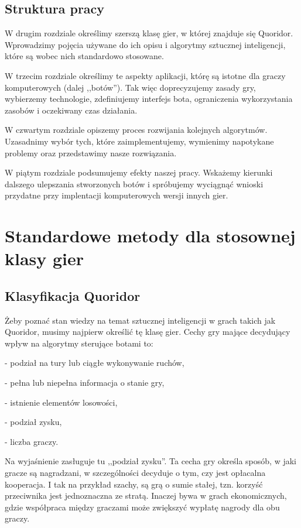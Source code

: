 \documentclass{pracamgr}
\begin{document}
\section{Struktura pracy}

W drugim rozdziale określimy szerszą klasę gier, w której znajduje się Quoridor.
Wprowadzimy pojęcia używane do ich opisu i algorytmy sztucznej inteligencji, które są wobec nich standardowo stosowane.

W trzecim rozdziale określimy te aspekty aplikacji, którę są istotne dla graczy komputerowych (dalej ,,botów'').
Tak więc doprecyzujemy zasady gry, wybierzemy technologie, zdefiniujemy interfejs bota, ograniczenia wykorzystania zasobów i oczekiwany czas działania.

W czwartym rozdziale opiszemy proces rozwijania kolejnych algorytmów.
Uzasadnimy wybór tych, które zaimplementujemy, wymienimy napotykane problemy oraz przedstawimy nasze rozwiązania.

W piątym rozdziale podsumujemy efekty naszej pracy.
Wskażemy kierunki dalszego ulepszania stworzonych botów i spróbujemy wyciągnąć wnioski przydatne przy implentacji komputerowych wersji innych gier.

\chapter{Standardowe metody dla stosownej klasy gier}

\section{Klasyfikacja Quoridor}

Żeby poznać stan wiedzy na temat sztucznej inteligencji w grach takich jak Quoridor, musimy najpierw określić tę klasę gier.
Cechy gry mające decydujący wpływ na algorytmy sterujące botami to:

 - podział na tury lub ciągłe wykonywanie ruchów,

 - pełna lub niepełna informacja o stanie gry,

 - istnienie elementów losowości,

 - podział zysku,

 - liczba graczy.

Na wyjaśnienie zasługuje tu ,,podział zysku''.
Ta cecha gry określa sposób, w jaki gracze są nagradzani, w szczególności decyduje o tym, czy jest opłacalna kooperacja. I tak na przykład szachy, są grą o sumie stałej, tzn. korzyść przeciwnika jest jednoznaczna ze stratą. Inaczej bywa w grach ekonomicznych, gdzie współpraca między graczami może zwiększyć wypłatę nagrody dla obu graczy.
\end{document}
